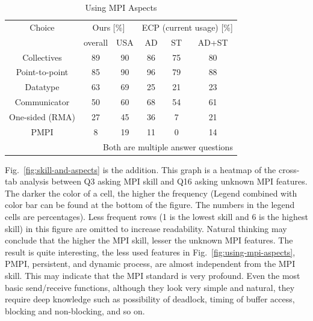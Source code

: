 \documentclass[preprint,5p,times]{elsarticle}
\begin{document}
\begin{table}[htb]%
  \begin{center}%
    \caption{Using MPI Aspects}\label{tab:using-mpi-aspects}%
    \begin{tabular}{c||c|c||c|c|c}%
      \hline%
      Choice & \multicolumn{2}{c||}{Ours [\%]} &
      \multicolumn{3}{c}{ECP {\scriptsize (current usage)} [\%]} \\
      \cline{2-6}%
      & overall & USA & AD & ST & {\small AD+ST} \\
      \hline%
      Collectives & 89 & 90 & 86 & 75 & 80 \\
      Point-to-point & 85 & 90 & 96 & 79 & 88 \\
      Datatype & 63 & 69 & 25 & 21 & 23 \\
      Communicator & 50 & 60 & 68 & 54 & 61 \\
      {\small One-sided (RMA)} & 27 & 45 & 36 & 7 & 21 \\
      PMPI & 8 & 19 & 11 & 0 & 14 \\
      \hline%
      \multicolumn{6}{r}{\small Both are multiple answer questions}
    \end{tabular}%
  \end{center}%
\end{table}%

Fig.~\ref{fig:skill-and-aspects} is the addition. This graph is a
heatmap of the cross-tab analysis between Q3 asking MPI skill and Q16
asking unknown MPI features. The darker the color of a cell, the
higher the frequency (Legend combined with color bar can be found at
the bottom of the figure. The numbers in the legend cells are
percentages). Less frequent
rows (1 is the lowest skill and 6 is the highest skill) in this figure are
omitted to increase readability. Natural thinking may conclude
that the higher the MPI skill, lesser the unknown MPI features. The
result is quite interesting, the less used features in
Fig.~\ref{fig:using-mpi-aspects}, PMPI, persistent, and dynamic
process, are almost independent from the MPI skill. This may indicate
that the MPI standard is very profound. Even the most basic
send/receive functions, although they look very simple and natural,
they require deep knowledge such as possibility of deadlock, timing of
buffer access, blocking and non-blocking, and so on.
\end{document}
